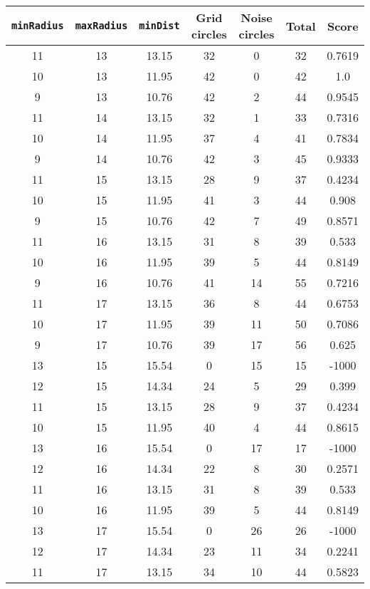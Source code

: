 \documentclass[letterpaper, 12pt]{article}
\begin{document}
\begin{longtable}{|c|c|c|c|c|c|c|}
\hline
\textbf{\texttt{minRadius}} & \textbf{\texttt{maxRadius}} & \textbf{\texttt{minDist}} & \textbf{Grid circles} & \textbf{Noise circles} & \textbf{Total} & \textbf{Score} \\
\hline
11 & 13 & 13.15 & 32 & 0 & 32 & 0.7619 \\
\hline
10 & 13 & 11.95 & 42 & 0 & 42 & 1.0 \\
\hline
9 & 13 & 10.76 & 42 & 2 & 44 & 0.9545 \\
\hline
11 & 14 & 13.15 & 32 & 1 & 33 & 0.7316 \\
\hline
10 & 14 & 11.95 & 37 & 4 & 41 & 0.7834 \\
\hline
9 & 14 & 10.76 & 42 & 3 & 45 & 0.9333 \\
\hline
11 & 15 & 13.15 & 28 & 9 & 37 & 0.4234 \\
\hline
10 & 15 & 11.95 & 41 & 3 & 44 & 0.908 \\
\hline
9 & 15 & 10.76 & 42 & 7 & 49 & 0.8571 \\
\hline
11 & 16 & 13.15 & 31 & 8 & 39 & 0.533 \\
\hline
10 & 16 & 11.95 & 39 & 5 & 44 & 0.8149 \\
\hline
9 & 16 & 10.76 & 41 & 14 & 55 & 0.7216 \\
\hline
11 & 17 & 13.15 & 36 & 8 & 44 & 0.6753 \\
\hline
10 & 17 & 11.95 & 39 & 11 & 50 & 0.7086 \\
\hline
9 & 17 & 10.76 & 39 & 17 & 56 & 0.625 \\
\hline
13 & 15 & 15.54 & 0 & 15 & 15 & -1000 \\
\hline
12 & 15 & 14.34 & 24 & 5 & 29 & 0.399 \\
\hline
11 & 15 & 13.15 & 28 & 9 & 37 & 0.4234 \\
\hline
10 & 15 & 11.95 & 40 & 4 & 44 & 0.8615 \\
\hline
13 & 16 & 15.54 & 0 & 17 & 17 & -1000 \\
\hline
12 & 16 & 14.34 & 22 & 8 & 30 & 0.2571 \\
\hline
11 & 16 & 13.15 & 31 & 8 & 39 & 0.533 \\
\hline
10 & 16 & 11.95 & 39 & 5 & 44 & 0.8149 \\
\hline
13 & 17 & 15.54 & 0 & 26 & 26 & -1000 \\
\hline
12 & 17 & 14.34 & 23 & 11 & 34 & 0.2241 \\
\hline
11 & 17 & 13.15 & 34 & 10 & 44 & 0.5823 \\
\hline

\end{longtable}
\end{document}
